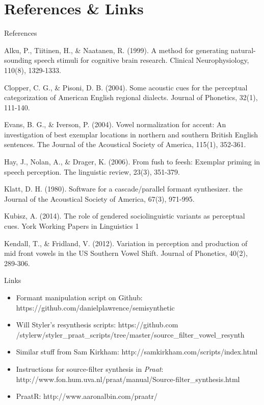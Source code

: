 \documentclass{beamer}
\begin{document}
\section{References \& Links}
\begin{frame}{References}
\begin{itemize}
\footnotesize{
\item{Alku, P., Tiitinen, H., \& Naatanen, R. (1999). A method for generating natural-sounding speech stimuli for cognitive brain research. Clinical Neurophysiology, 110(8), 1329-1333.}
\item{Clopper, C. G., \& Pisoni, D. B. (2004). Some acoustic cues for the perceptual categorization of American English regional dialects. Journal of Phonetics, 32(1), 111-140.}
\item{Evans, B. G., \& Iverson, P. (2004). Vowel normalization for accent: An investigation of best exemplar locations in northern and southern British English sentences. The Journal of the Acoustical Society of America, 115(1), 352-361.}
\item{Hay, J., Nolan, A., \& Drager, K. (2006). From fush to feesh: Exemplar priming in speech perception. The linguistic review, 23(3), 351-379.}
\item{Klatt, D. H. (1980). Software for a cascade/parallel formant synthesizer. the Journal of the Acoustical Society of America, 67(3), 971-995.}
\item{Kubisz, A. (2014). The role of gendered sociolinguistic variants as perceptual cues. York Working Papers in Linguistics 1}
\item{Kendall, T., \& Fridland, V. (2012). Variation in perception and production of mid front vowels in the US Southern Vowel Shift. Journal of Phonetics, 40(2), 289-306.}}
\end{itemize}
\end{frame}
\begin{frame}{Links}
\begin{itemize}
\footnotesize
\item{Formant manipulation script on Github: https://github.com/danielplawrence/semisynthetic}
\item{Will Styler's resynthesis scripts: https://github.com\\/stylerw/styler\_praat\_scripts/tree/master/source\_filter\_vowel\_resynth}
\item{Similar stuff from Sam Kirkham: http://samkirkham.com/scripts/index.html}
\item{Instructions for source-filter synthesis in \textit{Praat}: http://www.fon.hum.uva.nl/praat/manual/Source-filter\_synthesis.html}
\item{PraatR: http://www.aaronalbin.com/praatr/}
\end{itemize}
\end{frame}
\end{document}
